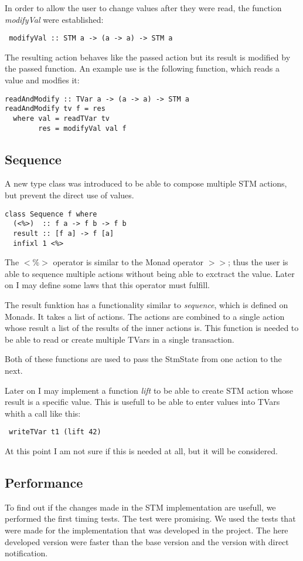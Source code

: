 \documentclass[a4paper,10pt]{article}
\begin{document}
In order to allow the user to change values after they were read, the function \textit{modifyVal} were established:
\begin{lstlisting}
 modifyVal :: STM a -> (a -> a) -> STM a
\end{lstlisting}
The resulting action behaves like the passed action but its result is modified by the passed function.
An example use is the following function, which reads a value and modfies it:
\begin{lstlisting}
readAndModify :: TVar a -> (a -> a) -> STM a
readAndModify tv f = res
  where val = readTVar tv
        res = modifyVal val f
\end{lstlisting}
        

\subsection{Sequence}
A new type class was introduced to be able to compose multiple STM actions, but prevent the direct use of values.
\begin{lstlisting}
class Sequence f where
  (<%>)  :: f a -> f b -> f b
  result :: [f a] -> f [a]
  infixl 1 <%>
\end{lstlisting}
The $<\%>$ operator is similar to the Monad operator $>>$; thus the user is able to sequence multiple actions without 
being able to exctract the value. Later on I may define some laws that this operator must fulfill.

The result funktion has a functionality similar to \textit{sequence}, which is defined on Monads. 
It takes a list of actions. The actions are combined to a single action whose result a list of the
results of the inner actions is. This function is needed to be able to read or create multiple TVars in a 
single transaction.

Both of these functions are used to pass the StmState from one action to the next. 

Later on I may implement a function \textit{lift} to be able to create STM action whose result is a 
specific value. This is usefull to be able to enter values into TVars whith a call like this:
\begin{lstlisting}
 writeTVar t1 (lift 42)
\end{lstlisting}
At this point I am not sure if this is needed at all, but it will be considered.

\subsection{Performance}
To find out if the changes made in the STM implementation are usefull, we performed the first timing tests.
The test were promising. We used the tests that were made for the implementation that was developed in the 
project. The here developed version were faster than the base version and the version with direct notification.
\end{document}
